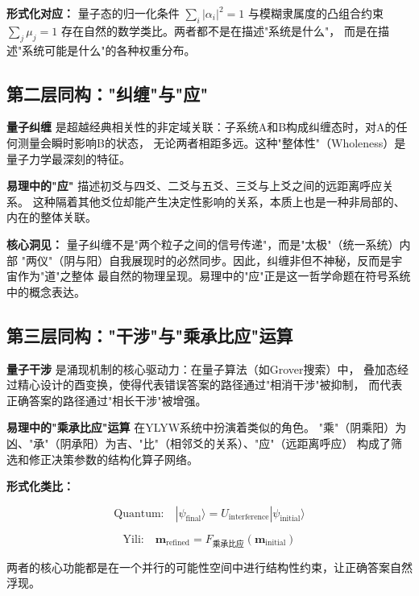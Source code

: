 \documentclass[twocolumn]{article}
\begin{document}
\textbf{形式化对应：} 量子态的归一化条件 $\sum_i |\alpha_i|^2 = 1$ 与模糊隶属度的凸组合约束
$\sum_j \mu_j = 1$ 存在自然的数学类比。两者都不是在描述"系统是什么"，
而是在描述"系统可能是什么"的各种权重分布。

\subsection{第二层同构："纠缠"与"应"}

\textbf{量子纠缠} 是超越经典相关性的非定域关联：子系统A和B构成纠缠态时，对A的任何测量会瞬时影响B的状态，
无论两者相距多远。这种"整体性"（Wholeness）是量子力学最深刻的特征\cite{bohr1949}。

\textbf{易理中的"应"} 描述初爻与四爻、二爻与五爻、三爻与上爻之间的远距离呼应关系。
这种隔着其他爻位却能产生决定性影响的关系，本质上也是一种非局部的、内在的整体关联。

\textbf{核心洞见：} 量子纠缠不是"两个粒子之间的信号传递"，而是"太极"（统一系统）内部
"两仪"（阴与阳）自我展现时的必然同步。因此，纠缠非但不神秘，反而是宇宙作为"道"之整体
最自然的物理呈现。易理中的"应"正是这一哲学命题在符号系统中的概念表达。

\subsection{第三层同构："干涉"与"乘承比应"运算}

\textbf{量子干涉} 是涌现机制的核心驱动力：在量子算法（如Grover搜索\cite{grover1996}）中，
叠加态经过精心设计的酉变换，使得代表错误答案的路径通过"相消干涉"被抑制，
而代表正确答案的路径通过"相长干涉"被增强。

\textbf{易理中的"乘承比应"运算} 在YLYW系统中扮演着类似的角色。
"乘"（阴乘阳）为凶、"承"（阴承阳）为吉、"比"（相邻爻的关系）、"应"（远距离呼应）
构成了筛选和修正决策参数的结构化算子网络。

\textbf{形式化类比：}

\begin{equation}
    \text{Quantum:} \quad |\psi_{\text{final}}\rangle = U_{\text{interference}} |\psi_{\text{initial}}\rangle
\end{equation}

\begin{equation}
    \text{Yili:} \quad  \mathbf{m}_{\text{refined}} = F_{\text{乘承比应}}(\mathbf{m}_{\text{initial}})
\end{equation}

两者的核心功能都是在一个并行的可能性空间中进行结构性约束，让正确答案自然浮现。
\end{document}
